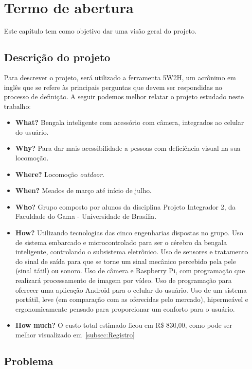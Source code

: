 \chapter[Termo de abertura]{Termo de abertura}
Este capítulo tem como objetivo dar uma visão geral do projeto.

\section{Descrição do projeto}

Para descrever o projeto, será utilizado a ferramenta 5W2H, um acrônimo em inglês que se refere às principais perguntas que devem ser respondidas no processo de definição.
A seguir podemos melhor relatar o projeto estudado neste trabalho:
\begin{itemize}

    \item \textbf{What?}  Bengala inteligente com acessório com câmera, integrados ao celular do usuário.
    \item \textbf{Why?} Para dar mais acessibilidade a pessoas com deficiência visual na sua locomoção.
    \item \textbf{Where?} Locomoção \textit{outdoor}.
    \item \textbf{When?} Meados de março até início de julho.
    \item \textbf{Who?} Grupo composto por alunos da disciplina Projeto Integrador 2, da Faculdade do Gama - Universidade de Brasília.
    \item \textbf{How?} Utilizando tecnologias das cinco engenharias dispostas no grupo. Uso de sistema embarcado e microcontrolado para ser o cérebro da bengala inteligente,
    controlando o subsistema eletrônico. Uso de sensores e tratamento do sinal de saída para que se torne um sinal mecânico percebido pela pele (sinal tátil) ou sonoro. Uso de câmera e Raspberry Pi, com programação que realizará processamento de imagem por vídeo. Uso de programação para oferecer uma aplicação Android para o celular do usuário. Uso de um sistema portátil, leve (em comparação com as oferecidas pelo mercado), hipermeável e ergonomicamente pensado para proporcionar um conforto para o usuário. 
    \item \textbf{How much?} O custo total estimado ficou em R\$ 830,00, como pode ser melhor visualizado em~\ref{subsec:Registro}
\end{itemize}


\section{Problema}

